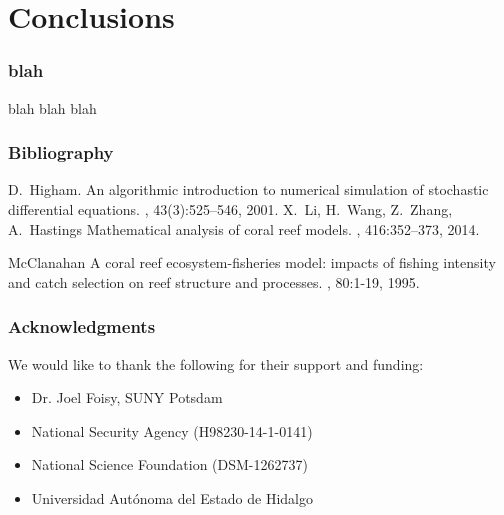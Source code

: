 
\section{Conclusions}


\begin{frame}
  \frametitle{blah}

  blah blah blah

\end{frame}

 
\begin{frame}
  \frametitle{Bibliography}

 \begin{thebibliography}{1}

   D.~Higham.
   \newblock An algorithmic introduction to numerical simulation of stochastic
   differential equations.
   , 43(3):525--546, 2001.
   X.~Li, H.~Wang, Z.~Zhang, A.~Hastings
   \newblock Mathematical analysis of coral reef models.
   , 416:352--373, 2014.

    McClanahan
    \newblock A coral reef ecosystem-fisheries model: impacts of fishing intensity and catch selection on reef structure and processes.
    , 80:1-19, 1995.

  \end{thebibliography}
  
\end{frame}

\begin{frame}
  \frametitle{Acknowledgments}
  
  We would like to thank the following for their support and funding: 
  
 \begin{itemize}
 \item Dr. Joel Foisy, SUNY Potsdam
 \item National Security Agency (H98230-14-1-0141)
 \item National Science Foundation (DSM-1262737)
 \item Universidad Aut\'onoma del Estado de Hidalgo
 \end{itemize}
\end{frame}


